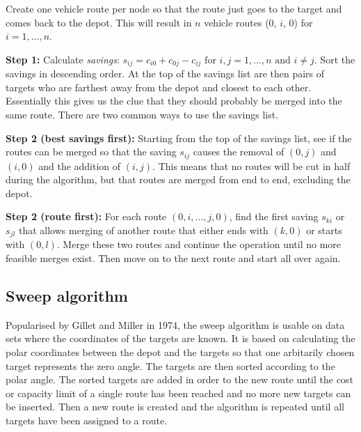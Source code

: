 \bigskip
\noindent
Create one vehicle route per node so that the route just goes to the target and comes back to the depot. This will result in $n$ vehicle routes (0, $i$, 0) for $i = 1, \ldots, n$. \cite{reimann2004d}

\medskip
\noindent
\textbf{Step 1:} Calculate \textit{savings}: $s_{ij} = c_{i0} + c_{0j} - c_{ij} \text{ for } i, j = 1, \ldots, n \text{ and } i \neq j$. Sort the savings in descending order. \cite{reimann2004d} At the top of the savings list are then pairs of targets who are farthest away from the depot and closest to each other. Essentially this gives us the clue that they should probably be merged into the same route. There are two common ways to use the savings list.


\medskip
\noindent
\textbf{Step 2 (best savings first):} Starting from the top of the savings list, see if the routes can be merged so that the saving $s_{ij}$ causes the removal of $(0, j)$ and $(i, 0)$ and the addition of $(i, j)$. \cite{reimann2004d} This means that no routes will be cut in half during the algorithm, but that routes are merged from end to end, excluding the depot.

\medskip
\noindent
\textbf{Step 2 (route first):} For each route $(0, i, \ldots, j, 0)$, find the first saving $s_{ki}$ or $s_{jl}$ that allows merging of another route that either ends with $(k, 0)$ or starts with $(0, l)$. Merge these two routes and continue the operation until no more feasible merges exist. Then move on to the next route and start all over again. \cite{laporte2000classical}

 



\subsection{Sweep algorithm}			

Popularised by Gillet and Miller in 1974, the sweep algorithm is usable on data sets where the coordinates of the targets are known. It is based on calculating the polar coordinates between the depot and the targets so that one arbitarily chosen target represents the zero angle. The targets are then sorted according to the polar angle. The sorted targets are added in order to the new route until the cost or capacity limit of a single route has been reached and no more new targets can be inserted. Then a new route is created and the algorithm is repeated until all targets have been assigned to a route. \cite{gillett1974heuristic}

